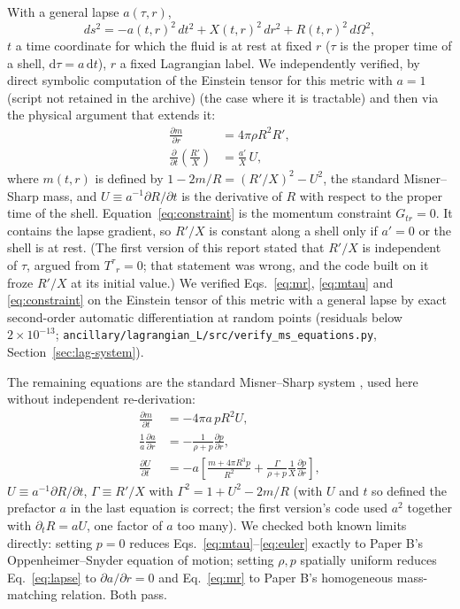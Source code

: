 \documentclass[11pt]{article}
\begin{document}
With a general lapse $a(\tau,r)$,
\begin{equation}
ds^2 = -a(t,r)^2\,dt^2 + X(t,r)^2\,dr^2 + R(t,r)^2\,d\Omega^2,
\end{equation}
$t$ a time coordinate for which the fluid is at rest at fixed $r$ ($\tau$ is the proper time of a shell, $\mathrm d\tau=a\,\mathrm dt$), $r$ a fixed Lagrangian label. We independently verified, by direct symbolic computation of the Einstein tensor for this metric with $a=1$ (script not retained in the archive) (the case where it is tractable) and then via the physical argument that extends it:
\begin{align}
\frac{\partial m}{\partial r} &= 4\pi \rho R^2 R', \label{eq:mr}\\
\frac{\partial}{\partial t}\!\left(\frac{R'}{X}\right) &= \frac{a'}{X}\,U, \label{eq:constraint}
\end{align}
where $m(t,r)$ is defined by $1-2m/R = (R'/X)^2 - U^2$, the standard Misner--Sharp mass, and $U\equiv a^{-1}\partial R/\partial t$ is the derivative of $R$ with respect to the proper time of the shell. Equation~\eqref{eq:constraint} is the momentum constraint $G_{tr}=0$. It contains the lapse gradient, so $R'/X$ is constant along a shell only if $a'=0$ or the shell is at rest. (The first version of this report stated that $R'/X$ is independent of $\tau$, argued from $T^\tau{}_r=0$; that statement was wrong, and the code built on it froze $R'/X$ at its initial value.) We verified Eqs.~\eqref{eq:mr}, \eqref{eq:mtau} and \eqref{eq:constraint} on the Einstein tensor of this metric with a general lapse by exact second-order automatic differentiation at random points (residuals below $2\times10^{-13}$; \texttt{ancillary/lagrangian\_L/src/verify\_ms\_equations.py}, Section~\ref{sec:lag-system}).

The remaining equations are the standard Misner--Sharp system \citep{MisnerSharp1964}, used here without independent re-derivation:
\begin{align}
\frac{\partial m}{\partial t} &= -4\pi a\,p R^2 U, \label{eq:mtau}\\
\frac{1}{a}\frac{\partial a}{\partial r} &= -\frac{1}{\rho+p}\frac{\partial p}{\partial r}, \label{eq:lapse}\\
\frac{\partial U}{\partial t} &= -a\left[\frac{m+4\pi R^3 p}{R^2} + \frac{\Gamma}{\rho+p}\frac{1}{X}\frac{\partial p}{\partial r}\right], \label{eq:euler}
\end{align}
$U\equiv a^{-1}\partial R/\partial t$, $\Gamma\equiv R'/X$ with $\Gamma^2=1+U^2-2m/R$ (with $U$ and $t$ so defined the prefactor $a$ in the last equation is correct; the first version's code used $a^2$ together with $\partial_tR=aU$, one factor of $a$ too many). We checked both known limits directly: setting $p=0$ reduces Eqs.~\eqref{eq:mtau}--\eqref{eq:euler} exactly to Paper B's Oppenheimer--Snyder equation of motion; setting $\rho,p$ spatially uniform reduces Eq.~\eqref{eq:lapse} to $\partial a/\partial r=0$ and Eq.~\eqref{eq:mr} to Paper B's homogeneous mass-matching relation. Both pass.
\end{document}
